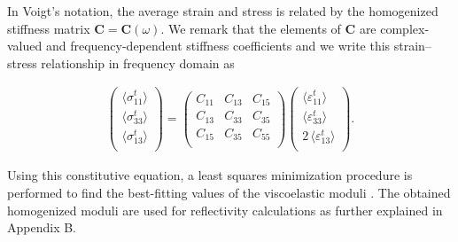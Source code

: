 \documentclass[draft]{agujournal2019}
\begin{document}
In Voigt's notation, the average strain and stress is related by the homogenized stiffness matrix $\bm{C} = \bm{C} (\omega) $. We remark that the elements of $\bm{C}$  are  complex-valued and frequency-dependent stiffness coefficients and we write this strain--stress relationship in frequency domain as
\begin{linenomath*}
\begin{equation}\label{Eq.13}
 \begin{split}
 \begin{pmatrix}
 \langle \sigma_{11}^t\rangle \\
 \langle \sigma_{33}^t\rangle \\
  \langle\sigma_{13}^t\rangle \\
 \end{pmatrix}
 =
   \begin{pmatrix}
  C_{11} & C_{13} & C_{15} \\
  C_{13} & C_{33} & C_{35} \\
  C_{15} & C_{35} & C_{55}\\
 \end{pmatrix}
  \begin{pmatrix}
 \langle\varepsilon_{11}^t \rangle \\
 \langle \varepsilon_{33}^t \rangle \\
 2\, \langle \varepsilon_{13}^t \rangle \\
 \end{pmatrix}.
 \end{split}
\end{equation}
\end{linenomath*}
Using this constitutive equation, a least squares minimization procedure is performed to find the best-fitting values of the viscoelastic moduli \cite{Rubino2016}. The obtained homogenized moduli are used for reflectivity calculations as further explained in Appendix B.
\end{document}
